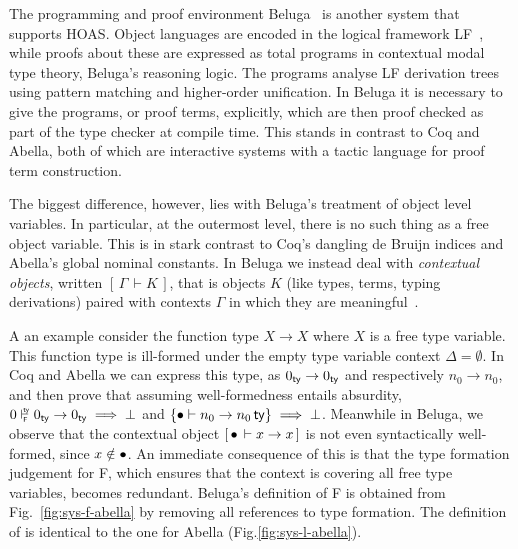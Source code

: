 \newcommand{\tax}{\textsf{t\_ax}}
\newcommand{\tpi}{\textsf{t\_pi}~}
\newcommand{\tlam}{\textsf{t\_lam}~}
\newcommand{\tapp}{\textsf{t\_app}~}
\newcommand{\ptc}{\textsf{p\_tc}}

\newcommand{\rall}{\textsf{r\_all}}
\newcommand{\rarr}{\textsf{r\_arr}}
\newcommand{\rapp}{\textsf{r\_app}}
\newcommand{\rtapp}{\textsf{r\_App}}
\newcommand{\rlam}{\textsf{r\_lam}}
\newcommand{\rtlam}{\textsf{r\_Lam}}

\newcommand{\D}{\mathcal{D}}

\newcommand{\bc}[2]{\ensuremath{[\,#1\,\vdash #2\,]}}

The programming and proof environment Beluga~\cite{Pientka:IJCAR10,Pientka:FLOPS10,Pientka:CADE15} is another system that supports HOAS.
Object languages are encoded in the logical framework LF~\cite{Harper93jacm}, while proofs about these are expressed as total programs in contextual modal type theory, Beluga's reasoning logic.
The programs analyse LF derivation trees using pattern matching and higher-order unification.
In Beluga it is necessary to give the programs, or proof terms, explicitly, which are then proof checked as part of the type checker at compile time.
This stands in contrast to Coq and Abella, both of which are interactive systems with a tactic language for proof term construction.

The biggest difference, however, lies with Beluga's treatment of object level variables.
In particular, at the outermost level, there is no such thing as a free object variable.
This is in stark contrast to Coq's dangling de Bruijn indices and Abella's global nominal constants.
In Beluga we instead deal with \emph{contextual objects}, written $\bc{\Gamma}{K}$, that is objects $K$ (like types, terms, typing derivations) paired with contexts $\Gamma$ in which they are meaningful~\cite{Nanevski:ICML05,Pientka:POPL08}.

A an example consider the function type $X \to X$ where $X$ is a free type variable.
This function type is ill-formed under the empty type variable context $\Delta = \emptyset$.
In Coq and Abella we can express this type, as $0_{\mathsf{ty}} \to 0_{\mathsf{ty}}$ and respectively $n_0 \to n_0$, and then prove that assuming well-formedness entails absurdity, $\istyF{0}{0_\ty \to 0_\ty} \implies \bot$ and $\{\bullet \vdash n_0 \to n_0\,\mathsf{ty}\} \implies \bot$.
Meanwhile in Beluga, we observe that the contextual object $\bc{\emptyctx}{x \to x}$ is not even syntactically well-formed, since $x \notin \bullet$.
An immediate consequence of this is that the type formation judgement for F, which ensures that the context is covering all free type variables, becomes redundant.
Beluga's definition of F is obtained from Fig.~\ref{fig:sys-f-abella} by removing all references to type formation.
The definition of \SysL is identical to the one for Abella (Fig.\ref{fig:sys-l-abella}).

